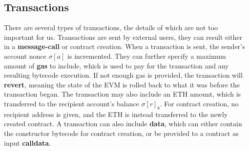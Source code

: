 \subsection{Transactions}
There are several types of transactions, the details of which are not too important for us. Transactions are sent by external users, they can result either in a \textbf{message-call} or contract creation. When a transaction is sent, the sender's account nonce $\sigma[a]$ is incremented. They can further specify a maximum amount of \textbf{gas} to include, which is used to pay for the transaction and any resulting bytecode execution. If not enough gas is provided, the transaction will \textbf{revert}, meaning the state of the EVM is rolled back to what it was before the transaction began. The transaction may also include an ETH amount, which is transferred to the recipient account's balance $\sigma[r]_b$. For contract creation, no recipient address is given, and the ETH is instead transferred to the newly created contract. A transaction can also include \textbf{data}, which can either contain the constructor bytecode for contract creation, or be provided to a contract as input \textbf{calldata}.


